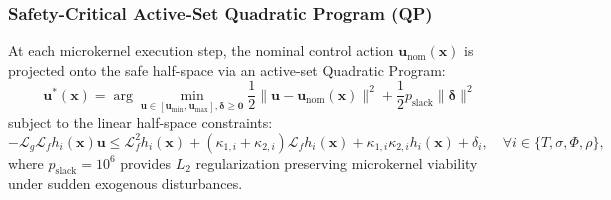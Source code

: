 \documentclass[11pt,onecolumn]{article}
\begin{document}
\FloatBarrier
\begin{table}[!htbp]
\centering\small
\caption{Relative-Degree $r=2$ Physical Barrier Constraints for Swarm Spacecraft Protection.}
\label{tab:hocbf_physical_constraints}
\end{table}
\FloatBarrier

\subsubsection{Safety-Critical Active-Set Quadratic Program (QP)}
At each microkernel execution step, the nominal control action $\mathbf{u}_{\text{nom}}(\mathbf{x})$ is projected onto the safe half-space via an active-set Quadratic Program:
\begin{equation}
    \mathbf{u}^*(\mathbf{x}) = \arg\min_{\mathbf{u} \in [\mathbf{u}_{\min}, \mathbf{u}_{\max}], \boldsymbol{\delta} \ge \mathbf{0}} \frac{1}{2}\|\mathbf{u} - \mathbf{u}_{\text{nom}}(\mathbf{x})\|^2 + \frac{1}{2} p_{\text{slack}} \|\boldsymbol{\delta}\|^2
    \label{eq:hocbf_qp}
\end{equation}
subject to the linear half-space constraints:
\begin{equation}
    -\mathcal{L}_g \mathcal{L}_f h_i(\mathbf{x}) \mathbf{u} \le \mathcal{L}_f^2 h_i(\mathbf{x}) + (\kappa_{1,i} + \kappa_{2,i})\mathcal{L}_f h_i(\mathbf{x}) + \kappa_{1,i}\kappa_{2,i} h_i(\mathbf{x}) + \delta_i, \quad \forall i \in \{T, \sigma, \Phi, \rho\},
\end{equation}
where $p_{\text{slack}} = 10^6$ provides $L_2$ regularization preserving microkernel viability under sudden exogenous disturbances.
\end{document}

